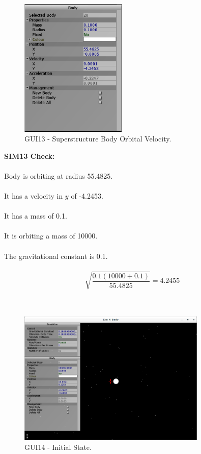 \begin{figure}
  \centering
  \includegraphics[width=0.45\textwidth]{img/testingEvidence/gui13.png}
  \caption{GUI13 - Superstructure Body Orbital Velocity.}
  \vspace{-10pt}
\end{figure}
\textbf{SIM13 Check:} \\\\
Body is orbiting at radius 55.4825. \\\\
It has a velocity in $y$ of -4.2453. \\\\
It has a mass of 0.1. \\\\
It is orbiting a mass of 10000. \\\\
The gravitational constant is 0.1. \\\\

$$\sqrt{\frac{0.1(10000+0.1)}{55.4825}} = 4.2455$$ \\\\

\pagebreak

\begin{figure}[H]
  \centering
  \includegraphics[width=0.8\textwidth]{img/testingEvidence/gui14_0.png}
  \caption{GUI14 - Initial State.}
\end{figure}

